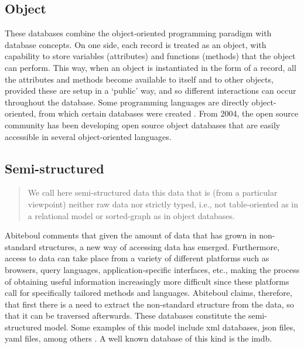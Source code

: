 \subsection{Object}
\label{model:object}


These databases combine the object-oriented programming paradigm with database concepts. On one side, each record is treated as an object, with capability to store variables (attributes) and functions (methods) that the object can perform. This way, when an object is instantiated in the form of a record, all the attributes and methods become available to itself and to other objects, provided these are setup in a `public' way, and so different interactions can occur throughout the database. Some programming languages are directly object-oriented, from which certain databases were created . From 2004, the open source community has been developing open source object databases that are easily accessible in several object-oriented languages.

\subsection{Semi-structured}
\label{model:semistructured}


\begin{quote}
	We call here semi-structured data this data that is (from a particular viewpoint) neither raw data nor strictly typed, i.e., not table-oriented as in a relational model or sorted-graph as in object databases. \parencite{Abiteboul:semistructured:96}
\end{quote}

Abiteboul \parencite{Abiteboul:semistructured:96} comments that given the amount of data that has grown in non-standard structures, a new way of accessing data has emerged. Furthermore, access to data can take place from a variety of different platforms such as browsers, query languages, application-specific interfaces, etc., making the process of obtaining useful information increasingly more difficult since these platforms call for specifically tailored methods and languages. Abiteboul claims, therefore, that first there is a need to extract the non-standard structure from the data, so that it can be traversed afterwards. These databases constitute the semi-structured model. Some examples of this model include \gls{xml} databases, \gls{json} files, \gls{yaml} files, among others \parencite{Buneman:1997:SD:263661.263675}. A well known database of this kind is the \gls{imdb}.

